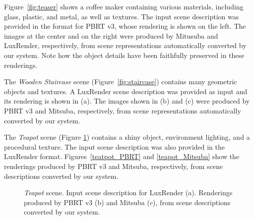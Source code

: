Figure~\ref{fig:teaser} shows a coffee maker containing various materials, including glass, plastic, and metal, as well as textures. The input scene description was provided in the format for PBRT v3, whose rendering is shown on the left. The images at the center and on the right were produced by Mitusuba and LuxRender, respectively, from scene representations automatically converted by our system. Note how the object details have been faithfully preserved in these renderings.

The \textit{Wooden Staircase} scene (Figure~\ref{fig:staircase}) contains many geometric objects and textures. A LuxRender scene description was provided as input and its rendering is shown in (a). The images shown in (b) and (c) were produced by PBRT v3 and Mitsuba, respectively, from scene representations automatically converted by our system. 

The \textit{Teapot} scene (Figure \ref{fig:teapot}) contains a shiny object, environment lighting, and a procedural texture. The input scene description was also provided in the LuxRender format. Figures~\ref{teatpot_PBRT} and \ref{teapot_Mitsuba} show the renderings produced by PBRT v3 and Mitsuba, respectively, from scene descriptions converted by our system.

\begin{figure}
  \centering
  \caption{\textit{Teapot} scene. Input scene description for LuxRender (a). Renderings produced by PBRT v3 (b) and Mitsuba (c), from scene descriptions converted by our system.}
  \label{fig:teapot}
\end{figure}

